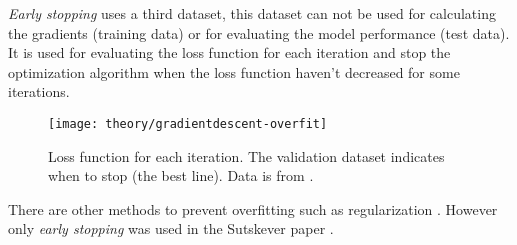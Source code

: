 \textit{Early stopping} uses a third dataset, this dataset can not be used for calculating the gradients (training data) or for evaluating the model performance (test data). It is used for evaluating the loss function for each iteration and stop the optimization algorithm when the loss function haven't decreased for some iterations. \cite{the-elements-of-statistical-learning, bishop, alexgraves}

\begin{figure}[h]
	\centering
	\texttt{[image: theory/gradientdescent-overfit]}
	\caption{Loss function for each iteration. The validation dataset indicates when to stop (the best line). Data is from \cite{alexgraves}.}
	\label{fig:theory:gradientdescent:overfit}
\end{figure}

There are other methods to prevent overfitting such as regularization \cite{the-elements-of-statistical-learning, bishop}. However only \textit{early stopping} was used in the Sutskever paper \cite{sutskever}.
